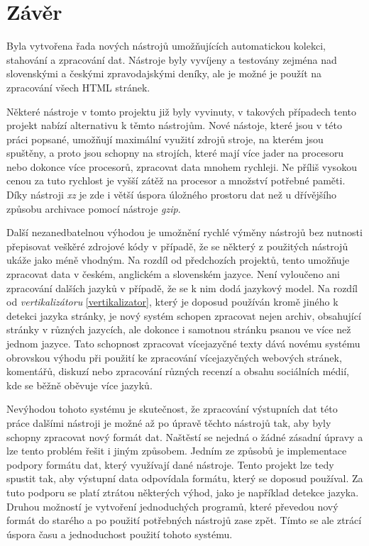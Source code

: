 \chapter{Závěr}
Byla vytvořena řada nových nástrojů umožňujících automatickou kolekci, stahování a
zpracování dat. Nástroje byly vyvíjeny a testovány zejména nad slovenskými a
českými zpravodajskými deníky, ale je možné je použít na zpracování
všech HTML stránek.

Některé nástroje v tomto projektu již byly vyvinuty, v takových případech tento projekt
nabízí alternativu k těmto nástrojům. Nové nástoje, které jsou v této práci popsané,
umožňují maximální využití zdrojů stroje, na kterém jsou spuštěny, a proto jsou
schopny na strojích, které mají více jader na procesoru nebo dokonce více procesorů,
zpracovat data mnohem rychleji. Ne příliš vysokou cenou za tuto rychlost je vyšší
zátěž na procesor a množství potřebné paměti. Díky nástroji \textit{xz} je
zde i větší úspora úložného prostoru dat než u dřívějšího způsobu archivace pomocí
nástroje \textit{gzip}.

Další nezanedbatelnou výhodou je umožnění rychlé výměny nástrojů bez nutnosti přepisovat veškěré
zdrojové kódy v případě, že se některý z použitých nástrojů ukáže jako méně vhodným.
Na rozdíl od předchozích projektů, tento umožňuje zpracovat data v českém, anglickém a
slovenském jazyce. Není vyloučeno ani zpracování dalších jazyků v případě, že se
k nim dodá jazykový model. Na rozdíl od \textit{vertikalizátoru} \ref{vertikalizator},
který je doposud používán kromě jiného k detekci jazyka stránky, je nový systém schopen zpracovat
nejen archiv, obsahující stránky v různých jazycích, ale dokonce i samotnou stránku psanou
ve více než jednom jazyce. Tato schopnost zpracovat vícejazyčné texty dává novému
systému obrovskou výhodu při použití ke zpracování vícejazyčných webových stránek,
komentářů, diskuzí nebo zpracování různých recenzí a obsahu sociálních médií, kde se běžně
oběvuje více jazyků.

Nevýhodou tohoto systému je skutečnost, že zpracování výstupních dat této práce dalšími nástroji
je možné až po úpravě těchto nástrojů tak, aby byly schopny zpracovat nový formát dat.
Naštěstí se nejedná o žádné zásadní úpravy a lze tento problém řešit i jiným způsobem. Jedním ze
způsobů je implementace podpory formátu dat, který využívají dané nástroje. Tento projekt
lze tedy spustit tak, aby výstupní data odpovídala formátu, který se doposud používal.
Za tuto podporu se platí ztrátou některých výhod, jako je například detekce
jazyka. Druhou možností je vytvoření jednoduchých programů, které převedou nový formát
do starého a po použití potřebných nástrojů zase zpět. Tímto se ale ztrácí úspora času
a jednoduchost použití tohoto systému.
